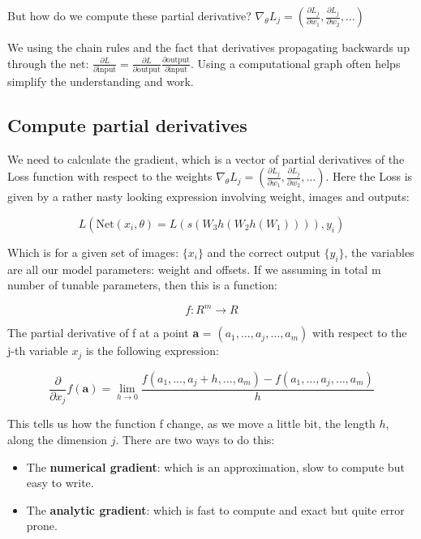 But how do we compute these partial derivative? $\nabla_\theta L_j = (\frac{\partial L_j} {\partial w_1},\frac{\partial L_j} {\partial w_2}, \ldots )$

We using the chain rules and the fact that derivatives propagating backwards up through the net: $\frac{\partial L} {\partial \text{input}} = \frac{\partial L} {\partial \text{output}}\frac{\partial \text{output}} {\partial \text{input}}$. Using a computational graph often helps simplify the understanding and work.

\subsection*{Compute partial derivatives}
We need to calculate the gradient, which is a vector of partial derivatives of the Loss function with respect to the weights $\nabla_\theta L_j = (\frac{\partial L_j} {\partial w_1},\frac{\partial L_j} {\partial w_2}, \ldots )$. Here the Loss is given by a rather nasty looking expression involving weight, images and outputs:

	\begin{equation}
		L(\text{Net}(x_i,\theta) = L(s(W_3h(W_2h(W_1)))),y_i) 
	\end{equation}

Which is for a given set of images: $\{x_i\}$ and the correct output $\{y_i\}$, the variables are all our model parameters: weight and offsets. If we assuming in total m number of tunable parameters, then this is a function:

	\begin{equation}
		f : R^{m} \rightarrow R
	\end{equation}

The partial derivative of f at a point \textbf{a} = $(a_1, \ldots, a_j, \ldots,a_m)$ with respect to the j-th variable $x_j$ is the following expression:

	\begin{equation}
		\frac{\partial} {\partial x_j}f(\textbf{a}) =  \lim_{h \rightarrow 0} \frac{f(a_1,\ldots, a_j +h, \ldots, a_m) - f(a_1, \ldots, a_j, \ldots, a_m)} {h} 
	\end{equation}

This tells us how the function f change, as we move a little bit, the length $h$, along the dimension $j$. There are two ways to do this:

\begin{itemize}
	\item The \textbf{numerical gradient}: which is an approximation, slow to compute but easy to write.
	\item The \textbf{analytic gradient}: which is fast to compute and exact but quite error prone.
\end{itemize}

